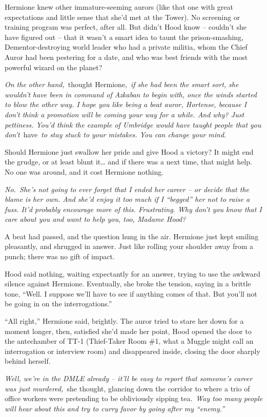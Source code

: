 Hermione knew other immature-seeming aurors (like that one with great
expectations and little sense that she'd met at the Tower). No screening
or training program was perfect, after all. But didn't Hood know --
couldn't she have figured out -- that it wasn't a smart idea to taunt
the prison-smashing, Dementor-destroying world leader who had a private
militia, whom the Chief Auror had been pestering for a date, and who was
best friends with the most powerful wizard on the planet?

\emph{On the other hand,}~thought Hermione,~\emph{if she had been the
smart sort, she wouldn't have been in command of Azkaban to begin with,
once the winds started to blow the other way. I hope you like being a
beat auror, Hortense, because I don't think a promotion will be coming
your way for a while. And why? Just pettiness. You'd think the example
of Umbridge would have taught people that you don't}~have~\emph{to stay
stuck to your mistakes. You can change your mind.}

Should Hermione just swallow her pride and give Hood a victory? It might
end the grudge, or at least blunt it\ldots{} and if there was a next
time, that might help. No one was around, and it cost Hermione nothing.

\emph{No.~She's not going to ever forget that I ended her career -- or
decide that the blame is her own. And she'd enjoy it too much if I
``begged'' her not to raise a fuss. It'd probably encourage more of
this. Frustrating. Why don't you know that I care about you and want to
help you, too, Madame Hood?}

A beat had passed, and the question hung in the air. Hermione just kept
smiling pleasantly, and shrugged in answer. Just like rolling your
shoulder away from a punch; there was no gift of impact.

Hood said nothing, waiting expectantly for an answer, trying to use the
awkward silence against Hermione. Eventually, she broke the tension,
saying in a brittle tone, ``Well. I suppose we'll have to see if
anything comes of that. But you'll not be going in on the
interrogations.''

``All right,'' Hermione said, brightly. The auror tried to stare her
down for a moment longer, then, satisfied she'd made her point, Hood
opened the door to the antechamber of TT-1 (Thief-Taker Room \#1, what a
Muggle might call an interrogation or interview room) and disappeared
inside, closing the door sharply behind herself.

\emph{Well, we're in the DMLE already -- it'll be easy to report that
someone's career was just murdered,}~she thought, glancing down the
corridor to where a trio of office workers were pretending to be
obliviously sipping tea.~\emph{Way too many people will hear about this
and try to curry favor by going after my ``enemy.''}

